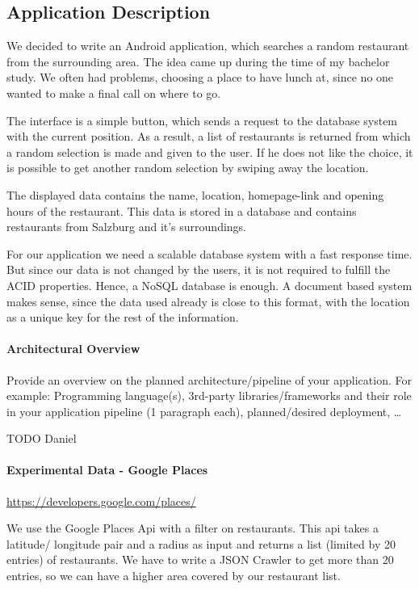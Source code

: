 \subsection{Application Description}

We decided to write an Android application, which searches a random restaurant from the surrounding area. The idea came up during the time of my bachelor study. We often had problems, choosing a place to have lunch at, since no one wanted to make a final call on where to go.

The interface is a simple button, which sends a request to the database system with the current position. As a result, a list of restaurants is returned from which a random selection is made and given to the user. If he does not like the choice, it is possible to get another random selection by swiping away the location.

The displayed data contains the name, location, homepage-link and opening hours of the restaurant. This data is stored in a database and contains restaurants from Salzburg and it's surroundings. 

For our application we need a scalable database system with a fast response time. But since our data is not changed by the users, it is not required to fulfill the ACID properties. Hence, a NoSQL database is enough. A document based system makes sense, since the data used already is close to this format, with the location as a unique key for the rest of the information.



\paragraph{Architectural Overview}

Provide an overview on the planned architecture/pipeline of your application.
For example: Programming language(s), 3rd-party libraries/frameworks and their
role in your application pipeline (1 paragraph each), planned/desired
deployment, \ldots

TODO Daniel

\paragraph{Experimental Data - Google Places}

\url{https://developers.google.com/places/}

We use the Google Places Api with a filter on restaurants. This api takes a latitude/ longitude pair and a radius as input and returns a list (limited by 20 entries) of restaurants. We have to write a JSON Crawler to get more than 20 entries, so we can have a higher area covered by our restaurant list. \\

